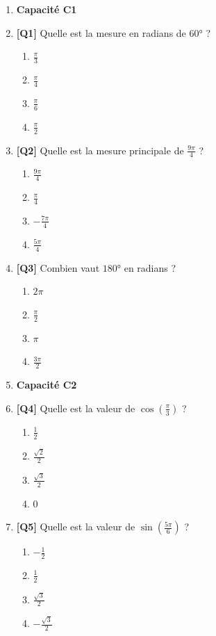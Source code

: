 \begin{enumerate}

\item[] \textbf{Capacité C1}

\item \textbf{[Q1]} Quelle est la mesure en radians de $60°$ ?
  \begin{enumerate}[label=\Alph*.]
    \item $\frac{\pi}{3}$
    \item $\frac{\pi}{4}$
    \item $\frac{\pi}{6}$
    \item $\frac{\pi}{2}$
  \end{enumerate}

\item \textbf{[Q2]} Quelle est la mesure principale de $\frac{9\pi}{4}$ ?
  \begin{enumerate}[label=\Alph*.]
    \item $\frac{9\pi}{4}$
    \item $\frac{\pi}{4}$
    \item $-\frac{7\pi}{4}$
    \item $\frac{5\pi}{4}$
  \end{enumerate}

\item \textbf{[Q3]} Combien vaut $180°$ en radians ?
  \begin{enumerate}[label=\Alph*.]
    \item $2\pi$
    \item $\frac{\pi}{2}$
    \item $\pi$
    \item $\frac{3\pi}{2}$
  \end{enumerate}

\item[] \textbf{Capacité C2}

\item \textbf{[Q4]} Quelle est la valeur de $\cos\left(\frac{\pi}{3}\right)$ ?
  \begin{enumerate}[label=\Alph*.]
    \item $\frac{1}{2}$
    \item $\frac{\sqrt{2}}{2}$
    \item $\frac{\sqrt{3}}{2}$
    \item $0$
  \end{enumerate}

\item \textbf{[Q5]} Quelle est la valeur de $\sin\left(\frac{5\pi}{6}\right)$ ?
  \begin{enumerate}[label=\Alph*.]
    \item $-\frac{1}{2}$
    \item $\frac{1}{2}$
    \item $\frac{\sqrt{3}}{2}$
    \item $-\frac{\sqrt{3}}{2}$
  \end{enumerate}


\end{enumerate}
